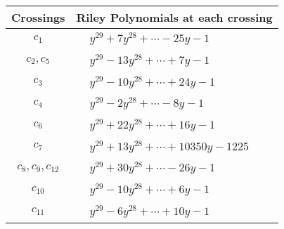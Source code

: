 \documentclass[1p]{elsarticle_modified}
\theoremstyle{definition}
\begin{document}
\begin{tabular}{m{50pt}|m{274pt}}
Crossings & \hspace{64pt}Riley Polynomials at each crossing \\
\hline $$\begin{aligned}c_{1}\end{aligned}$$&$\begin{aligned}
&y^{29}+7 y^{28}+\cdots-25 y-1
\end{aligned}$\\
\hline $$\begin{aligned}c_{2},c_{5}\end{aligned}$$&$\begin{aligned}
&y^{29}-13 y^{28}+\cdots+7 y-1
\end{aligned}$\\
\hline $$\begin{aligned}c_{3}\end{aligned}$$&$\begin{aligned}
&y^{29}-10 y^{28}+\cdots+24 y-1
\end{aligned}$\\
\hline $$\begin{aligned}c_{4}\end{aligned}$$&$\begin{aligned}
&y^{29}-2 y^{28}+\cdots-8 y-1
\end{aligned}$\\
\hline $$\begin{aligned}c_{6}\end{aligned}$$&$\begin{aligned}
&y^{29}+22 y^{28}+\cdots+16 y-1
\end{aligned}$\\
\hline $$\begin{aligned}c_{7}\end{aligned}$$&$\begin{aligned}
&y^{29}+13 y^{28}+\cdots+10350 y-1225
\end{aligned}$\\
\hline $$\begin{aligned}c_{8},c_{9},c_{12}\end{aligned}$$&$\begin{aligned}
&y^{29}+30 y^{28}+\cdots-26 y-1
\end{aligned}$\\
\hline $$\begin{aligned}c_{10}\end{aligned}$$&$\begin{aligned}
&y^{29}-10 y^{28}+\cdots+6 y-1
\end{aligned}$\\
\hline $$\begin{aligned}c_{11}\end{aligned}$$&$\begin{aligned}
&y^{29}-6 y^{28}+\cdots+10 y-1
\end{aligned}$\\
\hline
\end{tabular}\\~\\
\end{document}
